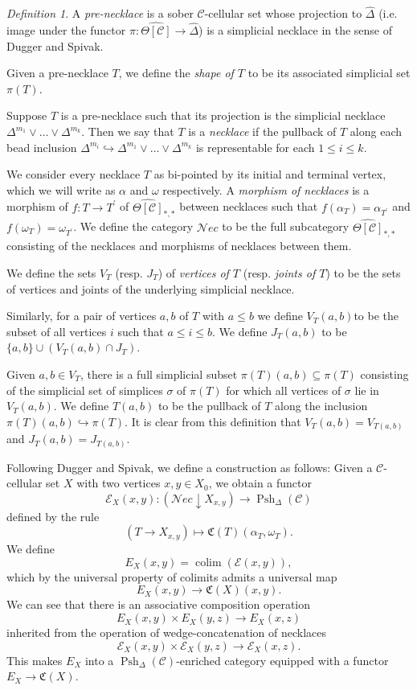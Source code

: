 \documentclass{amsart}
\numberwithin{equation}{section}
\theoremstyle{plain}   %
\theoremstyle{remark}
\newtheorem{defn}[subsection]{Definition}
\theoremstyle{plain}
\DeclareMathOperator{\colim}{colim}
\newcommand{\Nec}{\ensuremath{{\mathcal{N}ec}}}
\newcommand{\overcat}[2]{{\left(#1\downarrow #2\right)}}
\newcommand{\psh}[1]{\ensuremath{\widehat{#1}}}
\newcommand{\C}{\ensuremath{\mathcal{C}}}
\newcommand{\cellset}{\ensuremath{\widehat{\Theta[\mathcal{C}]}}}
\newcommand{\spsh}{\ensuremath{\operatorname{Psh}_\Delta(\mathcal{C})}}
\begin{document}
\begin{defn}
	A \emph{pre-necklace} is a sober \(\C\)-cellular set whose projection to \(\psh{\Delta}\) (i.e. image under the functor \(\pi: \cellset \to \psh{\Delta}\)) is a simplicial necklace in the sense of Dugger and Spivak.

	Given a pre-necklace \(T\), we define the \emph{shape of \(T\)} to be its associated simplicial set \(\pi(T)\).

	Suppose \(T\) is a pre-necklace such that its projection is the simplicial necklace \(\Delta^{m_1}\vee \dots \vee \Delta^{m_k}\). Then we say that \(T\) is a \emph{necklace} if the pullback of \(T\) along each bead inclusion \(\Delta^{m_i}\hookrightarrow \Delta^{m_1}\vee \dots \vee \Delta^{m_k}\) is representable for each \(1\leq i \leq k\).

	We consider every necklace \(T\) as bi-pointed by its initial and terminal vertex, which we will write as \(\alpha\) and \(\omega\) respectively.  A \emph{morphism of necklaces} is a morphism of \(f:T\to T^\prime\) of \(\cellset_{\ast,\ast}\) between necklaces such that \(f(\alpha_T)=\alpha_{T^\prime}\) and \(f(\omega_T)=\omega_{T^\prime}\). We define the category \(\Nec\) to be the full subcategory \(\cellset_{\ast,\ast}\) consisting of the necklaces and morphisms of necklaces between them.

	We define the sets \(V_T\) (resp. \(J_T\)) of \emph{vertices of \(T\)} (resp. \emph{joints of \(T\)}) to be the sets of vertices and joints of the underlying simplicial necklace.

	Similarly, for a pair of vertices \(a,b\) of \(T\) with \(a\leq b\) we define \(V_T(a,b)\)to be the subset of all vertices \(i\) such that \(a\leq i\leq b\). We define \(J_T(a,b)\) to be \(\{a,b\}\cup (V_T(a,b)\cap J_T)\).

	Given \(a,b\in V_T\), there is a full simplicial subset \(\pi(T)(a,b)\subseteq \pi(T)\) consisting of the simplicial set of simplices \(\sigma\) of \(\pi(T)\) for which all vertices of \(\sigma\) lie in \(V_T(a,b)\). We define \(T(a,b)\) to be the pullback of \(T\) along the inclusion \(\pi(T)(a,b)\hookrightarrow \pi(T)\).  It is clear from this definition that \(V_T(a,b)=V_{T(a,b)}\) and \(J_T(a,b)=J_{T(a,b)}\).
\end{defn}

Following Dugger and Spivak, we define a construction as follows: Given a \(\C\)-cellular set \(X\) with two vertices \(x,y\in X_0\), we obtain a functor \[\mathcal{E}_X(x,y):\overcat{\Nec}{X_{x,y}} \to \spsh\] defined by the rule \[(T\to X_{x,y})\mapsto \mathfrak{C}(T)(\alpha_T,\omega_T).\] We define \[E_X(x,y)=\colim(\mathcal{E}(x,y)),\] which by the universal property of colimits admits a universal map \[E_X(x,y)\to \mathfrak{C}(X)(x,y).\] We can see that there is an associative composition operation \[E_X(x,y)\times E_X(y,z)\to E_X(x,z)\] inherited from the operation of wedge-concatenation of necklaces \[\mathcal{E}_X(x,y)\times \mathcal{E}_X(y,z) \to \mathcal{E}_X(x,z).\] This makes \(E_X\) into a \(\spsh\)-enriched category equipped with a functor \(E_X\to \mathfrak{C}(X)\).
\end{document}
